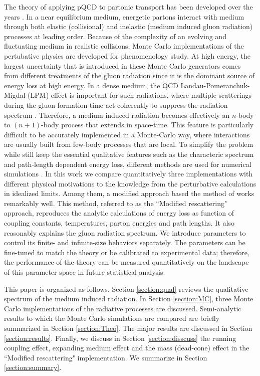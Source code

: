 \documentclass[aps, prc, reprint, amsmath, groupedaddress, nofootinbib]{revtex4-1}
\begin{document}
The theory of applying pQCD to partonic transport has been developed over the years \cite{Arnold:2002zm, Ghiglieri:2015ala}.
In a near equilibrium medium, energetic partons interact with medium through both elastic (collisional) and inelastic (medium induced gluon radiation) processes at leading order.
Because of the complexity of an evolving and fluctuating medium in realistic collisions, Monte Carlo implementations of the pertubative physics are developed for phenomenology study.
At high energy, the largest uncertainty that is introduced in these Monte Carlo generators comes from different treatments of the gluon radiation since it is the dominant source of energy loss at high energy.
In a dense medium, the QCD Landau-Pomeranchuk-Migdal (LPM) effect is important for such radiations, where multiple scatterings during the gluon formation time act coherently to suppress the radiation spectrum \cite{PhysRev.103.1811,Wang:1994fx,Zakharov:1996fv,Baier:1996kr}.
Therefore, a medium induced radiation becomes effectively an $n$-body to $(n+1)$-body process that extends in space-time.
This feature is particularly difficult to be accurately implemented in a Monte-Carlo way, where interactions are usually built from few-body processes that are local.
To simplify the problem while still keep the essential qualitative features such as the characteric spectrum and path-length dependent energy loss, different methods are used for numerical simulations \cite{Djordjevic:2008iz,Cao:2013ita,ColemanSmith:2012vr,Xu:2004mz,Zapp:2011ya,Gossiaux:2012cv,Park:thesis}.
In this work we compare quantitatively three implementations with different physical motivations to the knowledge from the perturbative calculations in idealized limits.
Among them, a modified approach based the method of \cite{Zapp:2011ya} works remarkably well.
This method, referred to as the ``Modified rescattering" approach, reproduces the analytic calculations of energy loss as function of coupling constants, temperatures, parton energies and path lengths.
It also reasonably explains the gluon radiation spectrum.
We introduce parameters to control its finite- and infinite-size behaviors separately.
The parameters can be fine-tuned to match the theory or be calibrated to experimental data;
therefore, the performance of the theory can be measured quantitatively on the landscape of this parameter space in future statistical analysis.

This paper is organized as follows. Section \ref{section:qual} reviews the qualitative spectrum of the medium induced radiation.
In Section \ref{section:MC}, three Monte Carlo implementations of the radiative processes are discussed. 
Semi-analytic results to which the Monte Carlo simulations are compared are briefly summarized in Section \ref{section:Theo}.
The major results are discussed in Section \ref{section:results}.
Finally, we discuss in Section \ref{section:disscuss} the running coupling effect, expanding medium effect and the mass (dead-cone) effect in the ``Modified rescattering" implementation. We summarize in Section \ref{section:summary}.
\end{document}
